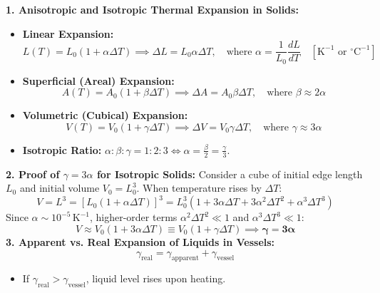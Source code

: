 \documentclass[10pt,a4paper]{article}
\begin{document}
\begin{formulabox}
\textbf{1. Anisotropic and Isotropic Thermal Expansion in Solids:}
\begin{itemize}
  \item \textbf{Linear Expansion:}
  \begin{equation}
    L(T) = L_0 (1 + \alpha \Delta T) \implies \Delta L = L_0 \alpha \Delta T, \quad \text{where } \alpha = \frac{1}{L_0}\frac{dL}{dT} \quad [\mathrm{K}^{-1} \text{ or } ^\circ\mathrm{C}^{-1}]
  \end{equation}
  \item \textbf{Superficial (Areal) Expansion:}
  \begin{equation}
    A(T) = A_0 (1 + \beta \Delta T) \implies \Delta A = A_0 \beta \Delta T, \quad \text{where } \beta \approx 2\alpha
  \end{equation}
  \item \textbf{Volumetric (Cubical) Expansion:}
  \begin{equation}
    V(T) = V_0 (1 + \gamma \Delta T) \implies \Delta V = V_0 \gamma \Delta T, \quad \text{where } \gamma \approx 3\alpha
  \end{equation}
  \item \textbf{Isotropic Ratio:} $\alpha : \beta : \gamma = 1 : 2 : 3 \iff \alpha = \frac{\beta}{2} = \frac{\gamma}{3}$.
\end{itemize}
\textbf{2. Proof of $\gamma = 3\alpha$ for Isotropic Solids:}
Consider a cube of initial edge length $L_0$ and initial volume $V_0 = L_0^3$. When temperature rises by $\Delta T$:
\begin{equation}
  V = L^3 = [L_0(1 + \alpha\Delta T)]^3 = L_0^3(1 + 3\alpha\Delta T + 3\alpha^2\Delta T^2 + \alpha^3\Delta T^3)
\end{equation}
Since $\alpha \sim 10^{-5}\,\mathrm{K}^{-1}$, higher-order terms $\alpha^2\Delta T^2 \ll 1$ and $\alpha^3\Delta T^3 \ll 1$:
\begin{equation}
  V \approx V_0(1 + 3\alpha\Delta T) \equiv V_0(1 + \gamma\Delta T) \implies \mathbf{\gamma = 3\alpha}
\end{equation}
\textbf{3. Apparent vs. Real Expansion of Liquids in Vessels:}
\begin{equation}
  \gamma_{\text{real}} = \gamma_{\text{apparent}} + \gamma_{\text{vessel}}
\end{equation}
\begin{itemize}
  \item If $\gamma_{\text{real}} > \gamma_{\text{vessel}}$, liquid level rises upon heating.

\end{itemize}
\end{formulabox}
\end{document}
